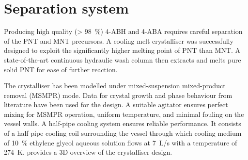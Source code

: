 \section*{Separation system}

Producing high quality (\SI{> 98}{\percent}) 4-ABH and 4-ABA requires careful separation of the PNT and MNT precursors. A cooling melt crystalliser was successfully designed to exploit the significantly higher melting point of PNT than MNT. A state-of-the-art continuous hydraulic wash column then extracts and melts pure solid PNT for ease of further reaction. 


The crystalliser has been modelled under mixed-suspension mixed-product removal (MSMPR) mode. Data for crystal growth and phase behaviour from literature have been used for the design. A suitable agitator ensures perfect mixing for MSMPR operation, uniform temperature, and minimal fouling on the vessel walls. A half-pipe cooling system ensures reliable performance. It consists of a half pipe cooling coil surrounding the vessel through which cooling medium of \SI{10}{\percent} ethylene glycol aqueous solution flows at \SI{7}{L/s} with a temperature of \SI{274}{K}.  provides a 3D overview of the crystalliser design.


